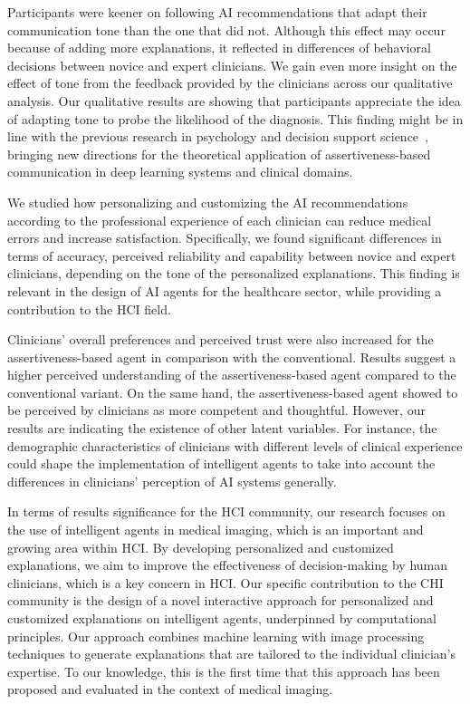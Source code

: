 Participants were keener on following AI recommendations that adapt their communication tone than the one that did not.
Although this effect may occur because of adding more explanations, it reflected in differences of behavioral decisions between novice and expert clinicians.
We gain even more insight on the effect of tone from the feedback provided by the clinicians across our qualitative analysis.
Our qualitative results are showing that participants appreciate the idea of adapting tone to probe the likelihood of the diagnosis.
This finding might be in line with the previous research in psychology and decision support science~\cite{LOMBROZO2010303, 10.1093/mind/fzu023, Seidel2021}, bringing new directions for the theoretical application of assertiveness-based communication in deep learning systems and clinical domains.

We studied how personalizing and customizing the AI recommendations according to the professional experience of each clinician can reduce medical errors and increase satisfaction.
Specifically, we found significant differences in terms of accuracy, perceived reliability and capability between novice and expert clinicians, depending on the tone of the personalized explanations.
This finding is relevant in the design of AI agents for the healthcare sector, while providing a contribution to the HCI field.

Clinicians' overall preferences and perceived trust were also increased for the assertiveness-based agent in comparison with the conventional.
Results suggest a higher perceived understanding of the assertiveness-based agent compared to the conventional variant.
On the same hand, the assertiveness-based agent showed to be perceived by clinicians as more competent and thoughtful.
However, our results are indicating the existence of other latent variables.
For instance, the demographic characteristics of clinicians with different levels of clinical experience could shape the implementation of intelligent agents to take into account the differences in clinicians' perception of AI systems generally.

In terms of results significance for the HCI community, our research focuses on the use of intelligent agents in medical imaging, which is an important and growing area within HCI.
By developing personalized and customized explanations, we aim to improve the effectiveness of decision-making by human clinicians, which is a key concern in HCI.
Our specific contribution to the CHI community is the design of a novel interactive approach for personalized and customized explanations on intelligent agents, underpinned by computational principles.
Our approach combines machine learning with image processing techniques to generate explanations that are tailored to the individual clinician's expertise.
To our knowledge, this is the first time that this approach has been proposed and evaluated in the context of medical imaging.

